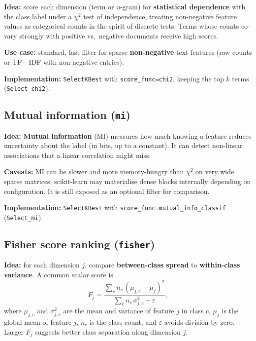 \documentclass[11pt,a4paper]{report}
\begin{document}
\textbf{Idea:} score each dimension (term or \textit{n}-gram) for \textbf{statistical dependence} with the class label under a $\chi^2$ test of independence, treating non-negative feature values as categorical counts in the spirit of discrete tests. Terms whose counts co-vary strongly with positive vs.\ negative documents receive high scores.

\textbf{Use case:} standard, fast filter for sparse \textbf{non-negative} text features (raw counts or TF---IDF with non-negative entries).

\textbf{Implementation:} \texttt{SelectKBest} with \texttt{score\_func=chi2}, keeping the top $k$ terms (\texttt{Select\_chi2}).

\subsection{Mutual information (\texttt{mi})}

\textbf{Idea:} \textbf{Mutual information} (MI) measures how much knowing a feature reduces uncertainty about the label (in bits, up to a constant). It can detect non-linear associations that a linear correlation might miss.

\textbf{Caveats:} MI can be slower and more memory-hungry than $\chi^2$ on very wide sparse matrices; scikit-learn may materialise dense blocks internally depending on configuration. It is still exposed as an optional filter for comparison.

\textbf{Implementation:} \texttt{SelectKBest} with \texttt{score\_func=mutual\_info\_classif} (\texttt{Select\_mi}).

\subsection{Fisher score ranking (\texttt{fisher})}

\textbf{Idea:} for each dimension $j$, compare \textbf{between-class spread} to \textbf{within-class variance}. A common scalar score is
\begin{equation}
    F_j = \frac{\sum_{c} n_c\, (\mu_{j,c} - \mu_j)^2}{\sum_{c} n_c\, \sigma_{j,c}^2 + \varepsilon},
\end{equation}
where $\mu_{j,c}$ and $\sigma_{j,c}^2$ are the mean and variance of feature $j$ in class $c$, $\mu_j$ is the global mean of feature $j$, $n_c$ is the class count, and $\varepsilon$ avoids division by zero. Larger $F_j$ suggests better class separation along dimension $j$.
\end{document}
